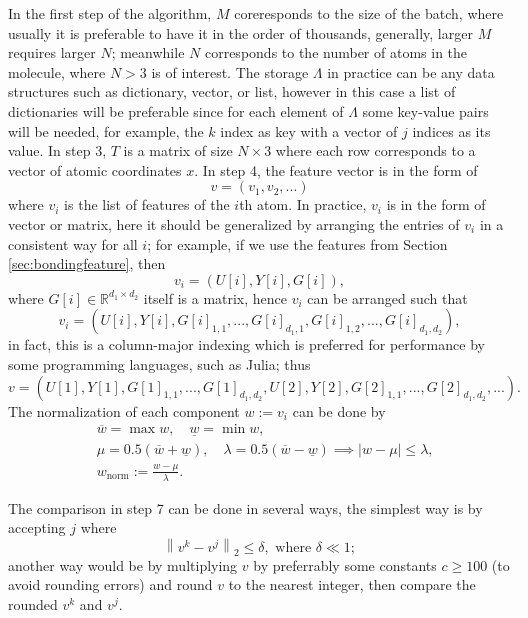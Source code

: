 \documentclass[12pt]{article}
\begin{document}
In the first step of the algorithm, $M$ coreresponds to the size of the batch, where usually it is preferable to have it in the order of thousands, generally, larger $M$ requires larger $N$; meanwhile $N$ corresponds to the number of atoms in the molecule, where $N > 3$ is of interest.
The storage $\Lambda$ in practice can be any data structures such as dictionary, vector, or list, however in this case a list of dictionaries will be preferable since for each element of $\Lambda$ some key-value pairs will be needed, for example, the $k$ index as key with a vector of $j$ indices as its value.
In step 3, $T$ is a matrix of size $N \times 3$ where each row corresponds to a vector of atomic coordinates $x$.
In step 4, the feature vector is in the form of 
\begin{equation*}
    v = (v_1, v_2, ...)
\end{equation*}
where $v_i$ is the list of features of the $i$th atom. In practice, $v_i$ is in the form of vector or matrix, here it should be generalized by arranging the entries of $v_i$ in a consistent way for all $i$;
for example, if we use the features from Section \ref{sec:bondingfeature}, then
\begin{equation*}
    v_i = (U[i], Y[i], G[i]),
\end{equation*}
where $G[i] \in \mathbb{R}^{d_1 \times d_2}$ itself is a matrix, hence $v_i$ can be arranged such that
\begin{equation*}
    v_i = (U[i], Y[i], G[i]_{1,1},..., G[i]_{d_1,1}, G[i]_{1,2},...,  G[i]_{d_1,d_2}),
\end{equation*}
in fact, this is a column-major indexing which is preferred for performance by some programming languages, such as Julia;
thus
\begin{equation*}
    v = (U[1], Y[1], G[1]_{1,1},..., G[1]_{d_1,d_2}, U[2], Y[2], G[2]_{1,1},..., G[2]_{d_1,d_2}, ...).
\end{equation*}
The normalization of each component $w := v_i $ can be done by
\begin{equation}
    \begin{split}
        &\overline{w} = \max w, \quad \underline{w} = \min w, \\
        &\mu = 0.5(\overline{w} + \underline{w}), \quad \lambda = 0.5(\overline{w} - \underline{w}) \implies |w - \mu|\leq \lambda, \\
        &w_\text{norm} := \frac{w - \mu}{\lambda}.
    \end{split}
\end{equation}

The comparison in step 7 can be done in several ways, the simplest way is by accepting $j$ where
\begin{equation*}
    \left\| v^k - v^j\right\|_2 \leq \delta, \text{ where } \delta \ll 1;
\end{equation*}
another way would be by multiplying $v$ by preferrably some constants $c \geq 100$ (to avoid rounding errors) and round $v$ to the nearest integer, then compare the rounded $v^k$ and $v^j$.
\end{document}

